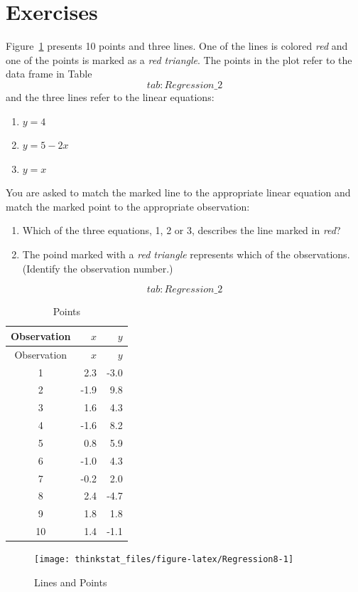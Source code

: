 \documentclass[]{krantz}
\theoremstyle{definition}
\theoremstyle{definition}
\theoremstyle{definition}
\theoremstyle{remark}
\let\BeginKnitrBlock\begin \let\EndKnitrBlock\end
\begin{document}
\section{Exercises}\label{exercises-9}

\BeginKnitrBlock{exercise}
\protect\hypertarget{exr:unnamed-chunk-218}{}{\label{exr:unnamed-chunk-218}
}Figure~\ref{fig:Regression8} presents 10 points and three lines. One of
the lines is colored \emph{red} and one of the points is marked as a
\emph{red triangle}. The points in the plot refer to the data frame in
Table~\[tab:Regression\_2\] and the three lines refer to the linear
equations:

\begin{enumerate}
\def\labelenumi{\arabic{enumi}.}
\item
  \(y = 4\)
\item
  \(y = 5 - 2x\)
\item
  \(y = x\)
\end{enumerate}

You are asked to match the marked line to the appropriate linear
equation and match the marked point to the appropriate observation:

\begin{enumerate}
\def\labelenumi{\arabic{enumi}.}
\item
  Which of the three equations, 1, 2 or 3, describes the line marked in
  \emph{red}?
\item
  The poind marked with a \emph{red triangle} represents which of the
  observations. (Identify the observation number.)
\end{enumerate}

\[tab:Regression\_2\]

\begin{longtable}[]{@{}crr@{}}
\caption{Points}\tabularnewline
\toprule
Observation & \(x\) & \(y\)\tabularnewline
\midrule
\endfirsthead
\toprule
Observation & \(x\) & \(y\)\tabularnewline
\midrule
\endhead
1 & 2.3 & -3.0\tabularnewline
2 & -1.9 & 9.8\tabularnewline
3 & 1.6 & 4.3\tabularnewline
4 & -1.6 & 8.2\tabularnewline
5 & 0.8 & 5.9\tabularnewline
6 & -1.0 & 4.3\tabularnewline
7 & -0.2 & 2.0\tabularnewline
8 & 2.4 & -4.7\tabularnewline
9 & 1.8 & 1.8\tabularnewline
10 & 1.4 & -1.1\tabularnewline
\bottomrule
\end{longtable}
\EndKnitrBlock{exercise}

\begin{figure}

{\centering \texttt{[image: thinkstat\_files/figure-latex/Regression8-1]} 

}

\caption{Lines and Points}\label{fig:Regression8}
\end{figure}
\end{document}
